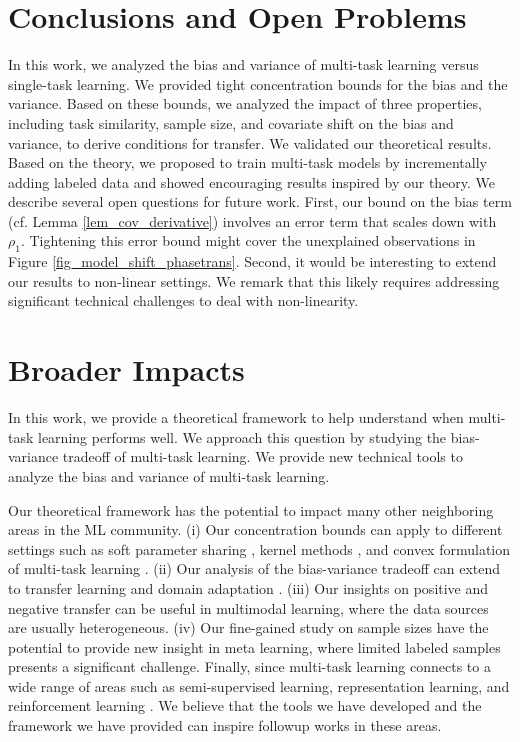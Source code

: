 \section{Conclusions and Open Problems}

In this work, we analyzed the bias and variance of multi-task learning versus single-task learning.
We provided tight concentration bounds for the bias and the variance.
Based on these bounds, we analyzed the impact of three properties, including task similarity, sample size, and covariate shift on the bias and variance, to derive conditions for transfer.
We validated our theoretical results.
Based on the theory, we proposed to train multi-task models by incrementally adding labeled data and showed encouraging results inspired by our theory.
We describe several open questions for future work.
First, our bound on the bias term (cf. Lemma \ref{lem_cov_derivative}) involves an error term that scales down with $\rho_1$.
Tightening this error bound might cover the unexplained observations in Figure \ref{fig_model_shift_phasetrans}.
Second, it would be interesting to extend our results to non-linear settings.
We remark that this likely requires addressing significant technical challenges  to deal with non-linearity.


\iffalse
\newpage
\section*{Broader Impacts}

In this work, we provide a theoretical framework to help understand when multi-task learning performs well.
We approach this question by studying the bias-variance tradeoff of multi-task learning.
We provide new technical tools to analyze the bias and variance of multi-task learning.

Our theoretical framework has the potential to impact many other neighboring areas in the ML community.
(i) Our concentration bounds can apply to different settings such as soft parameter sharing \cite{R17} , kernel methods \cite{EMP05}, and convex formulation of multi-task learning \cite{ZY14}.
(ii) Our analysis of the bias-variance tradeoff can extend to transfer learning and domain adaptation \cite{K18}.
(iii) Our insights on positive and negative transfer can be useful in multimodal learning, where the data sources are usually heterogeneous.
(iv) Our fine-gained study on sample sizes have the potential to provide new insight in meta learning, where limited labeled samples presents a significant challenge.
Finally, since multi-task learning connects to a wide range of areas \cite{V20} such as semi-supervised learning, representation learning, and reinforcement learning \cite{YKGLHF20}.%
We believe that the tools we have developed and the framework we have provided can inspire followup works in these areas.

